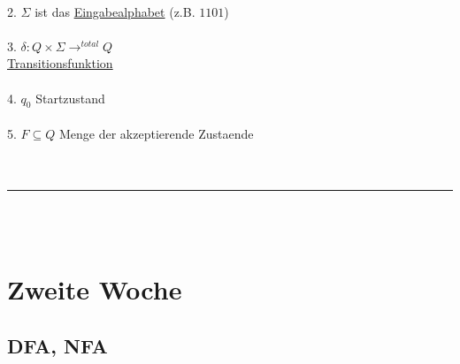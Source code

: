 \documentclass[18pt,a4paper]{scrreprt}
\newcommand{\tab}{\hspace*{2em}}
\begin{document}
\\
2. $\Sigma$ ist das \uline{Eingabealphabet} (z.B. $1101$)\\
\\
3. $\delta : Q \times \Sigma \rightarrow^{total} Q$\\
\tab \uline{Transitionsfunktion}\\
\\
4. $q_0$ Startzustand\\
\\
5. $F \subseteq Q$ Menge der akzeptierende Zustaende\\
\\
\\
\rule{\textwidth}{0.4mm}\\
\\
 
\chapter{Zweite Woche}


\section{DFA, NFA}
\end{document}
